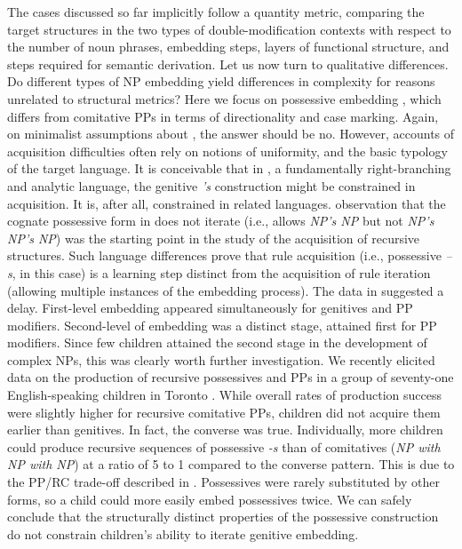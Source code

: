 \documentclass[output=paper]{langsci/langscibook}
\begin{document}
The cases discussed so far implicitly follow a quantity metric, comparing the
target structures in the two types of double-modification contexts with respect
to the number of noun phrases, embedding steps, layers of functional structure,
and steps required for semantic derivation. Let us now turn to qualitative
differences. Do different types of NP embedding yield differences in complexity
for reasons unrelated to structural metrics? Here we focus on possessive
embedding , which differs from comitative PPs  in
terms of directionality and case marking. Again, on minimalist assumptions
about , the answer should be no.  However, accounts of acquisition
difficulties often rely on notions of uniformity, and the basic typology of the
target language. It is conceivable that in , a fundamentally
right-branching and analytic language, the genitive \emph{'s}
construction might be constrained in acquisition. It is, after all, constrained
in related languages.  observation that the cognate
possessive form in  does not iterate (i.e.,  allows \emph{NP’s NP}
but not \emph{NP’s NP’s NP}) was the starting point in the study of the
acquisition of recursive  structures.  Such
language differences prove that rule acquisition
(i.e., possessive \emph{–s}, in this case) is a learning step distinct from the
acquisition of rule iteration (allowing multiple
instances of the embedding process).  The data in \citet{Perez-LerouxEtAl2012}
suggested a delay. First-level embedding appeared simultaneously for
genitives and PP modifiers. Second-level of embedding was a
distinct stage, attained first for PP modifiers. Since few children attained
the second stage in the development of complex NPs, this was clearly worth
further investigation.  We recently elicited data on the production of
recursive possessives and PPs in a group of seventy-one
English-speaking children in Toronto \parencite{Perez-LerouxEtAlinprep}. While
overall rates of production success were slightly higher for
recursive comitative PPs, children did not acquire them earlier
than genitives.  In fact, the converse was true.
Individually, more children could produce recursive sequences of
possessive \emph{-s} than of comitatives (\emph{NP with NP with NP}) at a ratio
of 5 to 1 compared to the converse pattern.  This is due to the PP/\gls{RC}
trade-off described in .  Possessives were rarely substituted by other
forms, so a child could more easily embed possessives twice. We can safely
conclude that the structurally distinct properties of the possessive
construction do not constrain children’s ability to iterate
genitive embedding.
\end{document}
